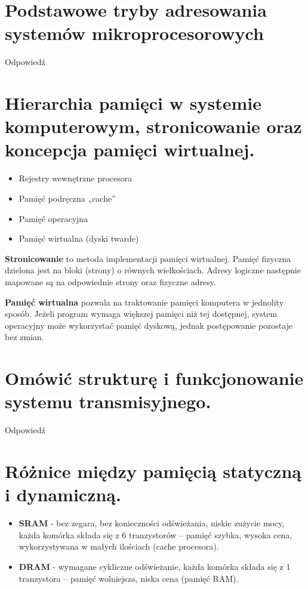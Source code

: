 \documentclass[12pt,a4paper]{article}
\begin{document}
	\section{Podstawowe tryby adresowania systemów mikroprocesorowych}
	Odpowiedź

	\section{Hierarchia pamięci w systemie komputerowym, stronicowanie oraz koncepcja pamięci wirtualnej.}
	\begin{itemize}
		\item Rejestry wewnętrzne procesora
		\item Pamięć podręczna „cache”
		\item Pamięć operacyjna
		\item Pamięć wirtualna (dyski twarde)
	\end{itemize}

	\textbf{Stronicowanie} to metoda implementacji pamięci wirtualnej. Pamięć fizyczna dzielona jest na bloki (strony) o równych wielkościach. Adresy logiczne następnie mapowane są na odpowiednie strony oraz fizyczne adresy.
	
	\textbf{Pamięć wirtualna} pozwala na traktowanie pamięci komputera w jednolity sposób. Jeżeli program wymaga większej pamięci niż tej dostępnej, system operacyjny może wykorzystać pamięć dyskową, jednak postępowanie pozostaje bez zmian.

	\section{Omówić strukturę i funkcjonowanie systemu transmisyjnego.}
	Odpowiedź

	\section{Różnice między pamięcią statyczną i dynamiczną.}
	\label{sec:statdyn}
	\begin{itemize}
		\item \textbf{SRAM} - bez zegara, bez konieczności odświeżania, niskie zużycie mocy, każda komórka składa się z 6 tranzystorów -- pamięć szybka, wysoka cena, wykorzystywana w małych ilościach (cache procesora). 
		\item \textbf{DRAM} -  wymagane cykliczne odświeżanie, każda komórka składa się z 1 tranzystora -- pamięć wolniejsza, niska cena (pamięć RAM).
	\end{itemize}
\end{document}
